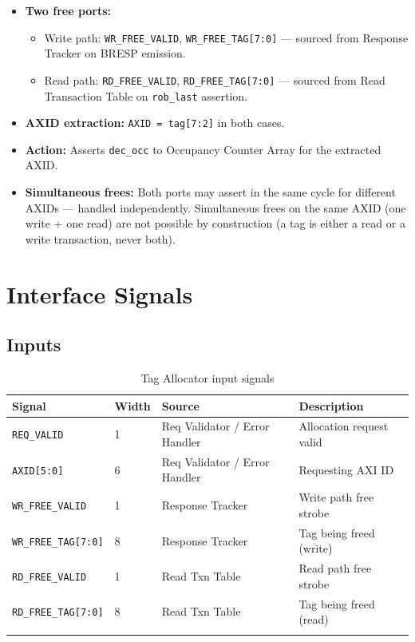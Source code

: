 \documentclass[11pt,a4paper]{article}
\begin{document}
\begin{itemize}
  \item \textbf{Two free ports:}
  \begin{itemize}
    \item Write path: \texttt{WR\_FREE\_VALID}, \texttt{WR\_FREE\_TAG[7:0]}
          — sourced from Response Tracker on BRESP emission.
    \item Read path: \texttt{RD\_FREE\_VALID}, \texttt{RD\_FREE\_TAG[7:0]}
          — sourced from Read Transaction Table on \texttt{rob\_last}
          assertion.
  \end{itemize}
  \item \textbf{AXID extraction:} \texttt{AXID = tag[7:2]} in both cases.
  \item \textbf{Action:} Asserts \texttt{dec\_occ} to Occupancy Counter
        Array for the extracted AXID.
  \item \textbf{Simultaneous frees:} Both ports may assert in the same
        cycle for different AXIDs — handled independently. Simultaneous
        frees on the same AXID (one write + one read) are not possible
        by construction (a tag is either a read or a write transaction,
        never both).
\end{itemize}

\section{Interface Signals}

\subsection{Inputs}

\begin{longtable}{llll}
\toprule
\textbf{Signal} & \textbf{Width} & \textbf{Source} & \textbf{Description} \\
\midrule
\texttt{REQ\_VALID}       & 1 & Req Validator / Error Handler & Allocation request valid \\
\texttt{AXID[5:0]}        & 6 & Req Validator / Error Handler & Requesting AXI ID \\
\texttt{WR\_FREE\_VALID}  & 1 & Response Tracker              & Write path free strobe \\
\texttt{WR\_FREE\_TAG[7:0]} & 8 & Response Tracker            & Tag being freed (write) \\
\texttt{RD\_FREE\_VALID}  & 1 & Read Txn Table                & Read path free strobe \\
\texttt{RD\_FREE\_TAG[7:0]} & 8 & Read Txn Table              & Tag being freed (read) \\
\bottomrule
\caption{Tag Allocator input signals}
\end{longtable}
\end{document}
